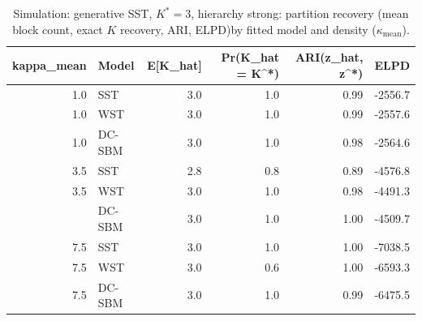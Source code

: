 \begin{table}
\centering
\caption{Simulation: generative SST, $K^*=3$, hierarchy strong: partition recovery (mean block count, exact $K$ recovery, ARI, ELPD)by fitted model and density ($\kappa_{\text{mean}}$).}
\centering
\begin{tabular}[t]{rlrrrr}
\toprule
kappa_mean & Model & E[K_hat] & Pr(K_hat = K^*) & ARI(z_hat, z^*) & ELPD\\
\midrule
1.0 & SST & 3.0 & 1.0 & 0.99 & -2556.7\\
1.0 & WST & 3.0 & 1.0 & 0.99 & -2557.6\\
1.0 & DC-SBM & 3.0 & 1.0 & 0.98 & -2564.6\\
3.5 & SST & 2.8 & 0.8 & 0.89 & -4576.8\\
3.5 & WST & 3.0 & 1.0 & 0.98 & -4491.3\\
\addlinespace
3.5 & DC-SBM & 3.0 & 1.0 & 1.00 & -4509.7\\
7.5 & SST & 3.0 & 1.0 & 1.00 & -7038.5\\
7.5 & WST & 3.0 & 0.6 & 1.00 & -6593.3\\
7.5 & DC-SBM & 3.0 & 1.0 & 0.99 & -6475.5\\
\bottomrule
\end{tabular}
\end{table}
